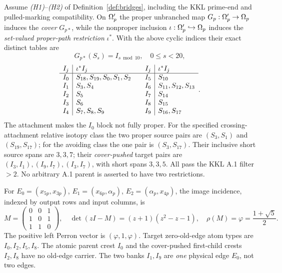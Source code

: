 \begin{theorem}
\label{thm:incidence}
Assume \emph{(H1)}--\emph{(H2)} of
Definition~\ref{def:bridges}, including the KKL
prime-end and pulled-marking compatibility.
On $\Omega'_p$ the proper unbranched map
$G_p:\Omega'_p\to\Omega_p$ induces the
\emph{cover} $G_{p*}$, while the
nonproper inclusion $\iota:\Omega'_p\hookrightarrow
\Omega_p$ induces the \emph{set-valued proper-path
restriction} $\iota^*$.  With the above cyclic
indices their exact distinct tables are
\begin{equation}\label{eq:cover}
 G_{p*}(S_s)=I_{s\bmod10},\quad 0\le s<20,
\end{equation}
\begin{equation}\label{eq:blocks}
\begin{array}{c|l@{\qquad}c|l}
I_j&\iota^*I_j&I_j&\iota^*I_j\\ \hline
I_0&S_{18},S_{19},S_0,S_1,S_2&
I_5&S_{10}\\
I_1&S_3,S_4&I_6&S_{11},S_{12},S_{13}\\
I_2&S_5&I_7&S_{14}\\
I_3&S_6&I_8&S_{15}\\
I_4&S_7,S_8,S_9&I_9&S_{16},S_{17}
\end{array}.
\end{equation}
The attachment makes the $I_0$ block
not fully proper.  For the specified
crossing-attachment relative isotopy
class the two proper source pairs are
$(S_3,S_1)$ and $(S_{19},S_{17})$;
for the avoiding class the one pair
is $(S_3,S_{17})$.  Their inclusive
short source spans are $3,3,7$;
their \emph{cover-pushed} target
pairs are $(I_3,I_1),(I_9,I_7),(I_3,I_7)$,
with short spans $3,3,5$.
All pass the KKL A.1 filter $>2$.
No arbitrary A.1 parent is asserted
to have two restrictions.

For $E_0=(x_{5p},x_{3p})$,
$E_1=(x_{6p},\alpha_p)$,
$E_2=(\alpha_p,x_{4p})$,
the image incidence, indexed by output
rows and input columns, is
\begin{equation}\label{eq:M}
 M=\begin{pmatrix}0&0&1\\1&0&1\\1&1&0\end{pmatrix},
 \quad\det(zI-M)=(z+1)(z^2-z-1),\quad
 \rho(M)=\varphi=\frac{1+\sqrt5}{2}.
\end{equation}
The positive left Perron vector is
$(\varphi,1,\varphi)$.
Target zero-old-edge atom types are
$I_0,I_2,I_5,I_8$.
The atomic parent crest $I_0$ and
the cover-pushed first-child crests
$I_2,I_8$ have no old-edge carrier.
The two banks $I_1,I_9$ are \emph{one}
physical edge $E_0$, not two edges.
\end{theorem}

